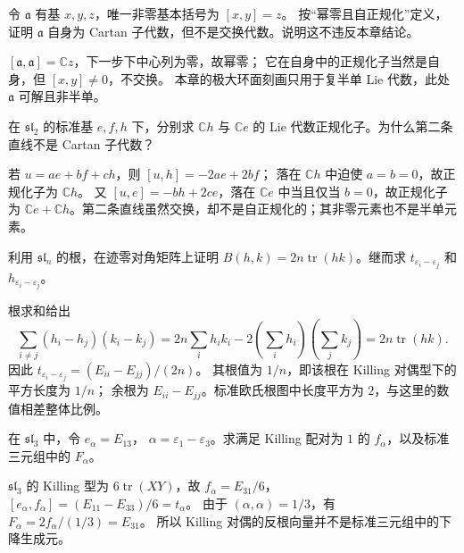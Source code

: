 \begin{exercise}\label{b5:ex:16-heisenberg-cartan}
	令 \(\mathfrak a\) 有基 \(x,y,z\)，唯一非零基本括号为 \([x,y]=z\)。 按“幂零且自正规化”定义，证明 \(\mathfrak a\) 自身为 Cartan 子代数，但不是交换代数。说明这不违反本章结论。
\end{exercise}
\begin{solution}
	\([\mathfrak a,\mathfrak a]=\mathbb Cz\)，下一步下中心列为零，故幂零； 它在自身中的正规化子当然是自身，但 \([x,y]\ne0\)，不交换。 本章的极大环面刻画只用于复半单 Lie 代数，此处 \(\mathfrak a\) 可解且非半单。
\end{solution}

\begin{exercise}\label{b5:ex:16-normalizer}
	在 \(\mathfrak{sl}_2\) 的标准基 \(e,f,h\) 下，分别求 \(\mathbb Ch\) 与 \(\mathbb Ce\) 的 Lie 代数正规化子。为什么第二条直线不是 Cartan 子代数？
\end{exercise}
\begin{solution}
	若 \(u=ae+bf+ch\)，则 \([u,h]=-2ae+2bf\)； 落在 \(\mathbb Ch\) 中迫使 \(a=b=0\)，故正规化子为 \(\mathbb Ch\)。 又 \([u,e]=-bh+2ce\)，落在 \(\mathbb Ce\) 中当且仅当 \(b=0\)，故正规化子为 \(\mathbb Ce+\mathbb Ch\)。第二条直线虽然交换，却不是自正规化的；其非零元素也不是半单元素。
\end{solution}

\begin{exercise}\label{b5:ex:16-killing-diagonal}
	利用 \(\mathfrak{sl}_n\) 的根，在迹零对角矩阵上证明 \(B(h,k)=2n\operatorname{tr}(hk)\)。继而求 \(t_{\varepsilon_i-\varepsilon_j}\) 和 \(h_{\varepsilon_i-\varepsilon_j}\)。
\end{exercise}
\begin{solution}
	根求和给出
	\[
		\sum_{i\ne j}(h_i-h_j)(k_i-k_j) =2n\sum_i h_i k_i-2\left(\sum_i h_i\right)\left(\sum_j k_j\right) =2n\operatorname{tr}(hk).
	\]
	因此 \(t_{\varepsilon_i-\varepsilon_j}=(E_{ii}-E_{jj})/(2n)\)。 其根值为 \(1/n\)，即该根在 Killing 对偶型下的平方长度为 \(1/n\)； 余根为 \(E_{ii}-E_{jj}\)。标准欧氏根图中长度平方为 \(2\)，与这里的数值相差整体比例。
\end{solution}

\begin{exercise}\label{b5:ex:16-dual-root-vectors}
	在 \(\mathfrak{sl}_3\) 中，令 \(e_\alpha=E_{13}\)， \(\alpha=\varepsilon_1-\varepsilon_3\)。求满足 Killing 配对为 \(1\) 的 \(f_\alpha\)，以及标准三元组中的 \(F_\alpha\)。
\end{exercise}
\begin{solution}
	\(\mathfrak{sl}_3\) 的 Killing 型为 \(6\operatorname{tr}(XY)\)，故 \(f_\alpha=E_{31}/6\)， \([e_\alpha,f_\alpha]=(E_{11}-E_{33})/6=t_\alpha\)。 由于 \((\alpha,\alpha)=1/3\)，有 \(F_\alpha=2f_\alpha/(1/3)=E_{31}\)。 所以 Killing 对偶的反根向量并不是标准三元组中的下降生成元。
\end{solution}

